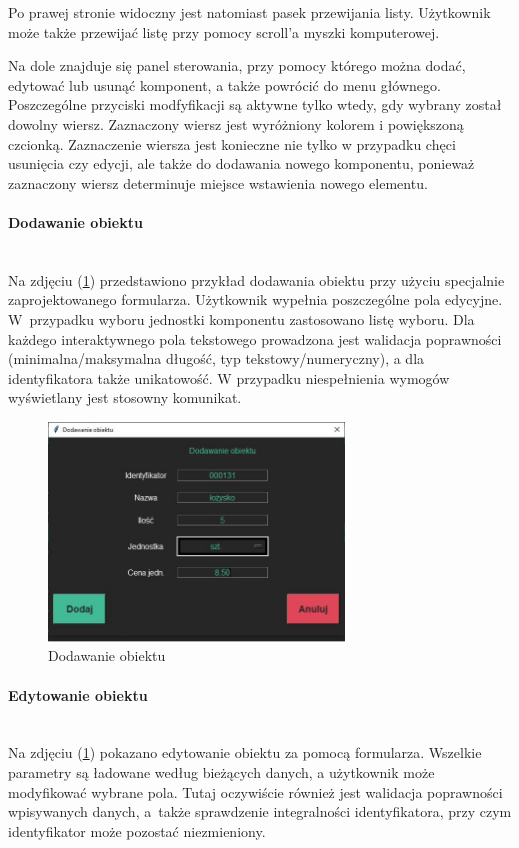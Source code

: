 \documentclass[12pt,twoside]{article}
\begin{document}
Po prawej stronie widoczny jest natomiast pasek przewijania listy. Użytkownik może także przewijać listę przy pomocy scroll'a myszki komputerowej.

Na dole znajduje się panel sterowania, przy pomocy którego można dodać, edytować lub usunąć komponent, a także powrócić do menu głównego. Poszczególne przyciski modfyfikacji są aktywne tylko wtedy, gdy wybrany został dowolny wiersz. Zaznaczony wiersz jest wyróżniony kolorem i powiększoną czcionką. Zaznaczenie wiersza jest konieczne nie tylko w przypadku chęci usunięcia czy edycji, ale także do dodawania nowego komponentu, ponieważ zaznaczony wiersz determinuje miejsce wstawienia nowego elementu.

\paragraph*{Dodawanie obiektu}\mbox{}\\
Na zdjęciu (\ref{fig:app:bom_add_item}) przedstawiono przykład dodawania obiektu przy użyciu specjalnie zaprojektowanego formularza. Użytkownik wypełnia poszczególne pola edycyjne. W~przypadku wyboru jednostki komponentu zastosowano listę wyboru. Dla każdego interaktywnego pola tekstowego prowadzona jest walidacja poprawności (minimalna/maksymalna długość, typ tekstowy/numeryczny), a dla identyfikatora także unikatowość. W przypadku niespełnienia wymogów wyświetlany jest stosowny komunikat.

\begin{figure}[H]
	\centering
	\includegraphics[width=0.7\textwidth]{figures/app/bom_add_item.jpg}
	\caption{Dodawanie obiektu}
\label{fig:app:bom_add_item}
\end{figure}

\paragraph*{Edytowanie obiektu}\mbox{}\\
Na zdjęciu (\ref{fig:app:bom_add_item}) pokazano edytowanie obiektu za pomocą formularza. Wszelkie parametry są ładowane według bieżących danych, a użytkownik może modyfikować wybrane pola. Tutaj oczywiście również jest walidacja poprawności wpisywanych danych, a~także sprawdzenie integralności identyfikatora, przy czym identyfikator może pozostać niezmieniony. 
\end{document}
